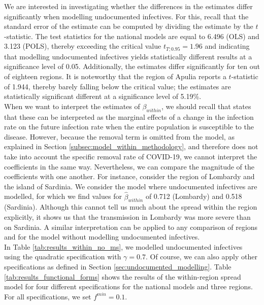 \documentclass[12pt]{article}
\begin{document}
    We are interested in investigating whether the differences in the estimates differ significantly when modelling undocumented infectives. For this, recall that the standard error of the estimate can be computed by dividing the estimate by the $t$-statistic. The test statistics for the national models are equal to 6.496 (OLS) and 3.123 (POLS), thereby exceeding the critical value $t_{T;0.95} = 1.96$ and indicating that modelling undocumented infectives yields statistically different results at a significance level of 0.05. Additionally, the estimates differ significantly for ten out of eighteen regions. It is noteworthy that the region of Apulia reports a $t$-statistic of 1.944, thereby barely falling below the critical value; the estimates are statistically significant different at a significance level of 5.19\%.
    \\

    When we want to interpret the estimates of $\beta_{within}$, we should recall that \textcite{adda2016economic} states that these can be interpreted as the marginal effects of a change in the infection rate on the future infection rate when the entire population is susceptible to the disease. However, because the removal term is omitted from the model, as explained in Section \ref{subsec:model_within_methodology}, and therefore does not take into account the specific removal rate of COVID-19, we cannot interpret the coefficients in the same way. Nevertheless, we can compare the magnitude of the coefficients with one another. For instance, consider the region of Lombardy and the island of Sardinia. We consider the model where undocumented infectives are modelled, for which we find values for $\widehat{\beta}_{within}$ of 0.712 (Lombardy) and 0.518 (Sardinia). Although this cannot tell us much about the spread within the region explicitly, it shows us that the transmission in Lombardy was more severe than on Sardinia. A similar interpretation can be applied to any comparison of regions and for the model without modelling undocumented infectives.
    \\
	
	In Table \ref{tab:results_within_no_ms}, we modelled undocumented infectives using the quadratic specification with $\gamma = 0.7$. Of course, we can also apply other specifications as defined in Section \ref{sec:undocumented_modelling}. Table \ref{tab:results_functional_forms} shows the results of the within-region spread model for four different specifications for the national models and three regions. For all specifications, we set $f^{min} = 0.1$.
	
\end{document}

